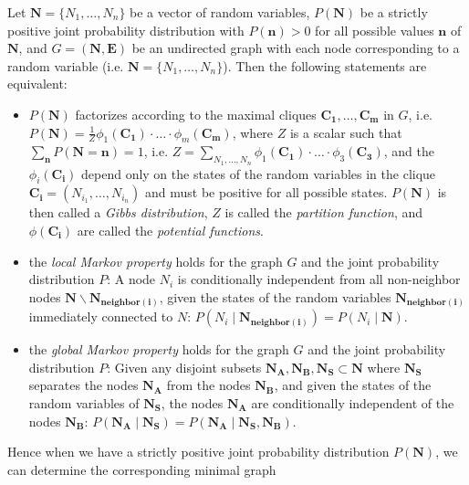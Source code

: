 Let $\mathbf{N}=\{N_{1},\dots,N_{n}\}$ be a vector of random variables,
$P(\mathbf{N})$ be a strictly positive joint probability distribution
with $P(\mathbf{n})>0$ for all possible values $\mathbf{n}$ of \textbf{$\mathbf{N}$},
and $G=(\mathbf{N},\mathbf{E})$ be an undirected graph with each
node corresponding to a random variable (i.e. $\mathbf{N}=\{N_{1},\dots,N_{n}\}$).
Then the following statements are equivalent:
\begin{itemize}
\item $P(\mathbf{N})$ factorizes according to the maximal cliques $\mathbf{C_{1}},\dots,\mathbf{C_{m}}$
in $G$, i.e. $P(\mathbf{N})=\frac{1}{Z}\phi_{1}(\mathbf{C_{1}})\cdot\ldots\cdot\phi_{m}(\mathbf{C_{m}})$,
where $Z$ is a scalar such that $\sum_{\mathbf{n}}P(\mathbf{N}=\mathbf{n})=1$,
i.e. $Z=\sum_{N_{1},\dots,N_{n}}\phi_{1}(\mathbf{C_{1}})\cdot\ldots\cdot\phi_{3}(\mathbf{C_{3}})$,
and the $\phi_{i}(\mathbf{C_{i}})$ depend only on the states of the
random variables in the clique $\mathbf{C_{i}}=(N_{i_{1}},\dots,N_{i_{n}})$
and must be positive for all possible states. $P(\mathbf{N})$ is
then called a \emph{Gibbs distribution},
$Z$ is called the \emph{partition function},
and $\phi(\mathbf{C_{i}})$ are called the \emph{potential functions}.
\item \label{local-Markov-property}the \emph{local Markov property}
holds for the graph $G$ and the joint probability distribution $P$:
A node $N_{i}$ is conditionally independent from all non-neighbor
nodes $\mathbf{N}\backslash\mathbf{N_{neighbor(i)}}$, given the states
of the random variables $\mathbf{N_{neighbor(i)}}$ immediately connected
to $N$: $P(N_{i}\mid\mathbf{N_{neighbor(i)}})=P(N_{i}\mid\mathbf{N})$.
\item the \emph{global Markov property} holds
for the graph $G$ and the joint probability distribution $P$: Given
any disjoint subsets $\mathbf{N_{A}},\mathbf{N_{B}},\mathbf{N_{S}}\subset\mathbf{N}$
where $\mathbf{N_{S}}$ separates the nodes $\mathbf{N_{A}}$ from
the nodes $\mathbf{N_{B}}$, and given the states of the random variables
of $\mathbf{N_{S}}$, the nodes $\mathbf{N_{A}}$ are conditionally
independent of the nodes $\mathbf{N_{B}}$: $P(\mathbf{N_{A}}\mid\mathbf{N_{S}})=P(\mathbf{N_{A}\mid}\mathbf{N_{S}},\mathbf{N_{B}})$.
\end{itemize}
Hence when we have a strictly positive joint probability distribution
$P(\mathbf{N})$, we can determine the corresponding minimal graph
